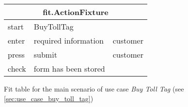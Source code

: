 
\begin{figure}
\centering
\begin{tabular}{|l|l|l|}
\hline 
\multicolumn{3}{|c|}{fit.ActionFixture}\tabularnewline
\hline 
start & BuyTollTag & \tabularnewline
\hline 
enter & required information & customer\tabularnewline
\hline 
press & submit & customer \tabularnewline
\hline 
check & form has been stored & \tabularnewline
\hline 
\end{tabular}
\caption{Fit table for the main scenario of use case \emph{Buy Toll Tag} (see \autoref{sec:use_case_buy_toll_tag})}
\end{figure}
